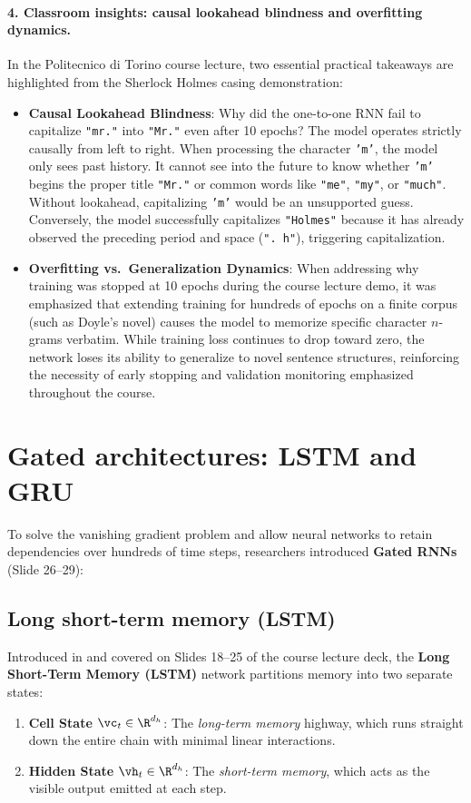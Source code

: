 \documentclass[../../main.tex]{subfiles}
\begin{document}
\paragraph{4. Classroom insights: causal lookahead blindness and overfitting dynamics.}
In the Politecnico di Torino course lecture, two essential practical takeaways are highlighted from the Sherlock Holmes casing demonstration:
\begin{itemize}
    \item \textbf{Causal Lookahead Blindness}: Why did the one-to-one RNN fail to capitalize \texttt{"mr."} into \texttt{"Mr."} even after 10 epochs? The model operates strictly causally from left to right. When processing the character \texttt{'m'}, the model only sees past history. It cannot see into the future to know whether \texttt{'m'} begins the proper title \texttt{"Mr."} or common words like \texttt{"me"}, \texttt{"my"}, or \texttt{"much"}. Without lookahead, capitalizing \texttt{'m'} would be an unsupported guess. Conversely, the model successfully capitalizes \texttt{"Holmes"} because it has already observed the preceding period and space (\texttt{". h"}), triggering capitalization.
    \item \textbf{Overfitting vs.~Generalization Dynamics}: When addressing why training was stopped at 10 epochs during the course lecture demo, it was emphasized that extending training for hundreds of epochs on a finite corpus (such as Doyle's novel) causes the model to memorize specific character $n$-grams verbatim. While training loss continues to drop toward zero, the network loses its ability to generalize to novel sentence structures, reinforcing the necessity of early stopping and validation monitoring emphasized throughout the course.
\end{itemize}

\section{Gated architectures: LSTM and GRU}
\label{sec:gated_architectures}

To solve the vanishing gradient problem and allow neural networks to retain dependencies over hundreds of time steps, researchers introduced \textbf{Gated RNNs} (Slide 26--29):

\subsection{Long short-term memory (LSTM)}
Introduced in \cite{hochreiter1997} and covered on Slides 18--25 of the course lecture deck, the \textbf{Long Short-Term Memory (LSTM)} network partitions memory into two separate states:
\begin{enumerate}
    \item \textbf{Cell State $\vc_t \in \R^{d_h}$}: The \emph{long-term memory} highway, which runs straight down the entire chain with minimal linear interactions.
    \item \textbf{Hidden State $\vh_t \in \R^{d_h}$}: The \emph{short-term memory}, which acts as the visible output emitted at each step.
\end{enumerate}
\end{document}
